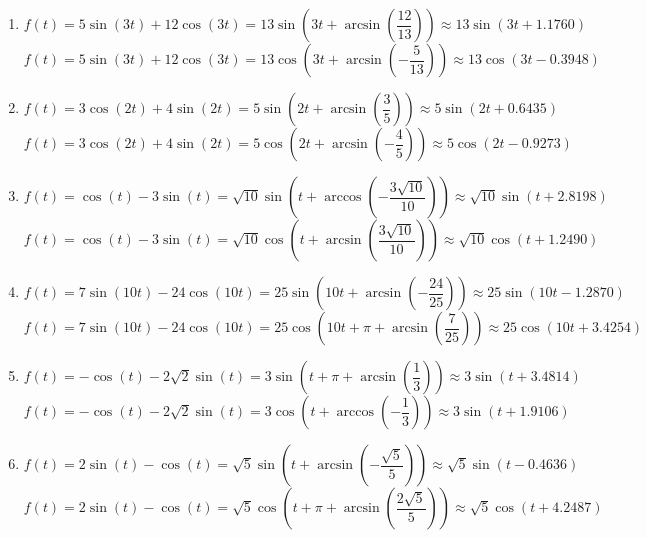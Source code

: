 \begin{enumerate}

\setcounter{enumi}{\value{HW}}

\item $f(t) = 5\sin(3t) + 12\cos(3t) = 13\sin\left(3t + \arcsin\left(\dfrac{12}{13}\right)\right) \approx 13\sin(3t + 1.1760)$ \\

$f(t) = 5\sin(3t) + 12\cos(3t) = 13\cos\left(3t + \arcsin\left(-\dfrac{5}{13}\right)\right) \approx 13\cos(3t -0.3948)$


\item $f(t) = 3\cos(2t) + 4\sin(2t) = 5\sin\left(2t+\arcsin\left(\dfrac{3}{5}\right) \right) \approx 5\sin(2t+0.6435)$ \\

 $f(t) = 3\cos(2t) + 4\sin(2t) = 5\cos\left(2t+\arcsin\left(-\dfrac{4}{5}\right) \right) \approx 5\cos(2t-0.9273)$
 
 
\item $f(t) = \cos(t) - 3\sin(t) = \sqrt{10} \sin\left(t + \arccos\left(-\dfrac{3\sqrt{10}}{10} \right)\right) \approx \sqrt{10} \sin(t + 2.8198)$ \\

$f(t) = \cos(t) - 3\sin(t) = \sqrt{10} \cos\left(t + \arcsin\left(\dfrac{3\sqrt{10}}{10} \right)\right) \approx \sqrt{10} \cos(t + 1.2490)$
 
 
\item  $f(t) = 7\sin(10t) - 24\cos(10t) = 25\sin\left( 10t + \arcsin\left(-\dfrac{24}{25}\right)\right) \approx 25 \sin(10t-1.2870)$ \\

$f(t) = 7\sin(10t) - 24\cos(10t) = 25\cos\left( 10t + \pi + \arcsin\left(\dfrac{7}{25}\right)\right) \approx 25 \cos(10t+3.4254)$


\item  $f(t) = -\cos(t) - 2\sqrt{2} \sin(t) = 3\sin\left(t+\pi + \arcsin\left(\dfrac{1}{3}\right)\right) \approx 3\sin(t+3.4814)$ \\


$f(t) = -\cos(t) - 2\sqrt{2} \sin(t) = 3\cos\left(t+ \arccos\left(-\dfrac{1}{3}\right)\right) \approx 3\sin(t+1.9106)$


\item $f(t) = 2\sin(t) - \cos(t) = \sqrt{5}\sin\left(t  + \arcsin\left(-\dfrac{\sqrt{5}}{5}\right)\right) \approx \sqrt{5}\sin(t -0.4636)$ \\

$f(t) = 2\sin(t) - \cos(t) = \sqrt{5}\cos\left(t  + \pi + \arcsin\left(\dfrac{2\sqrt{5}}{5}\right)\right) \approx \sqrt{5}\cos(t + 4.2487)$

\setcounter{HW}{\value{enumi}}

\end{enumerate}

